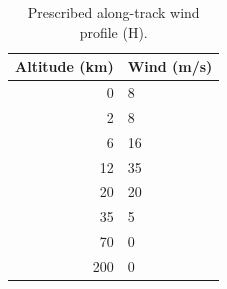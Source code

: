 \begin{table}[htbp]
\centering\small
\caption{Prescribed along-track wind profile (H).}
\label{tab:wind}
\begin{tabularx}{\linewidth}{@{}rX@{}}
\toprule
Altitude (km) & Wind (m/s) \\
\midrule
0 & 8 \\
2 & 8 \\
6 & 16 \\
12 & 35 \\
20 & 20 \\
35 & 5 \\
70 & 0 \\
200 & 0 \\
\bottomrule
\end{tabularx}
\par{}
\end{table}
